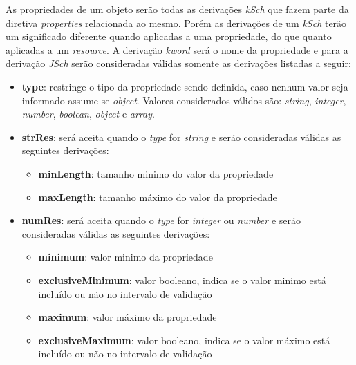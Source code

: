 \label{sec:bnf:props}
As propriedades de um objeto serão todas as derivações \textit{kSch} que fazem parte da diretiva \textit{properties} relacionada ao mesmo. Porém as derivações de um \textit{kSch} terão um significado diferente quando aplicadas a uma propriedade, do que quanto aplicadas a um \textit{resource}. A derivação \textit{kword} será o nome da propriedade e para a derivação \textit{JSch} serão consideradas válidas somente as derivações listadas a seguir:
\begin{itemize}


    \item \textbf{type}: restringe o tipo da propriedade sendo definida, caso nenhum valor seja informado assume-se \textit{object}. Valores considerados válidos são: \textit{string}, \textit{integer}, \textit{number}, \textit{boolean}, \textit{object} e \textit{array}.

    \item \textbf{strRes}: será aceita quando o \textit{type} for \textit{string} e serão consideradas válidas as seguintes derivações:
    \begin{itemize}
        \item \textbf{minLength}: tamanho minimo do valor da propriedade
        \item \textbf{maxLength}: tamanho máximo do valor da propriedade
    \end{itemize}

    \item \textbf{numRes}: será aceita quando o \textit{type} for \textit{integer} ou \textit{number} e serão consideradas válidas as seguintes derivações:
    \begin{itemize}
        \item \textbf{minimum}: valor minimo da propriedade
        \item \textbf{exclusiveMinimum}: valor booleano, indica se o valor minimo está incluído ou não no intervalo de validação
        \item \textbf{maximum}: valor máximo da propriedade
        \item \textbf{exclusiveMaximum}: valor booleano, indica se o valor máximo está incluído ou não no intervalo de validação
    \end{itemize}


\end{itemize}
